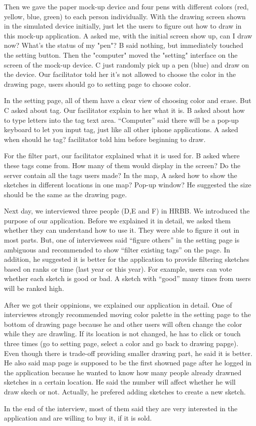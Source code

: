 \documentclass{www2010-submission}
\begin{document}
Then we gave the paper mock-up device and four pens with different colors (red,  yellow, blue, green) to each person individually. With the drawing screen shown in the simulated device initially, just let the users to figure out how to draw in this mock-up application.
A asked me, with the initial screen show up, can I draw now? What's the status of my "pen"?
B said nothing, but immediately touched the setting button. Then the "computer" moved the "setting" interface on the screen of the mock-up device. C just randomly pick up a pen (blue) and draw on the device. Our facilitator told her it's not allowed to choose the color in the drawing page, users should go to setting page to choose color.

In the setting page, all of them have a clear view of choosing color and erase. But C asked about tag. Our facilitator explain to her what it is. B asked about how to type letters into the tag text area. ``Computer'' said there will be a pop-up keyboard to let you input tag, just like all other iphone applications. A asked when should he tag? facilitator told him before beginning to draw.

For the filter part, our facilitator explained what it is used for. B asked where these tags come from. How many of them would display in the screen? Do the server contain all the tags users made? In the map, A asked how to show the sketches in different locations in one map? Pop-up window? He suggested the size should be the same as the drawing page. 

Next day, we interviewed three people (D,E and F) in HRBB. We introduced the purpose of our application. Before we explained it in detail, we asked them whether they can understand how to use it. They were able to figure it out in most parts. But, one of interviewees said ``figure others'' in the setting page is ambiguous and recommended to show ``filter existing tags'' on the page. In addition, he suggested it is better for the application to provide filtering sketches based on ranks or time (last year or this year). For example, users can vote whether each sketch is good or bad. A sketch with ``good'' many times from users will be ranked high. 

After we got their oppinions, we explained our application in detail. One of interviewes strongly recommended moving color palette in the setting page to the bottom of drawing page because he and other users will often change the color while they are drawling. If its location is not changed, he has to click or touch three times (go to setting page, select a color and go back to drawing papge). Even though there is trade-off providing smaller drawing part, he said it is better. He also said map page is supposed to be the first showned page after he logged in the application because he wanted to know how many people already drawned sketches in a certain location. He said the number will affect whether he will draw skech or not. Actually, he prefered adding sketches to create a new sketch. 

In the end of the interview, most of them said they are very interested in the application and are willing to buy it, if it is sold.

% 
%  
\end{document}
